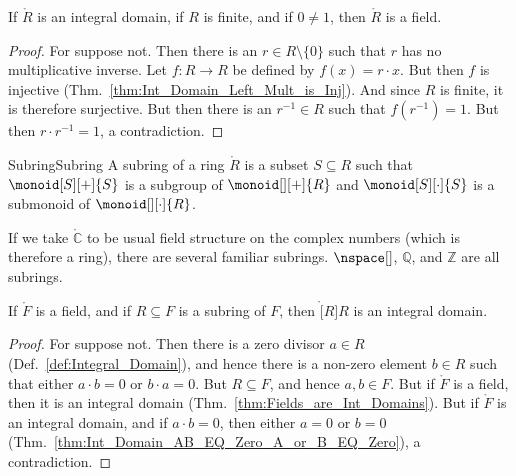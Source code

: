     \begin{theorem}
        \label{thm:Finite_Int_Domain_if_Field}%
        If $\ring{R}$ is an integral domain, if $R$ is finite, and if
        $0\ne{1}$, then $\ring{R}$ is a field.
    \end{theorem}
    \begin{proof}
        For suppose not. Then there is an $r\in{R}\setminus\{0\}$ such that
        $r$ has no multiplicative inverse. Let $f:R\rightarrow{R}$ be
        defined by $f(x)=r\cdot{x}$. But then $f$ is injective
        (Thm.~\ref{thm:Int_Domain_Left_Mult_is_Inj}). And since $R$ is
        finite, it is therefore surjective. But then there is an
        $r^{\minus{1}}\in{R}$ such that $f(r^{\minus{1}})=1$. But then
        $r\cdot{r}^{\minus{1}}=1$, a contradiction.
    \end{proof}
    \begin{fdefinition}{Subring}{Subring}
        A subring of a ring $\ring{R}$ is a subset $S\subseteq{R}$ such that
        $\monoid[S][+]{S}$ is a subgroup of $\monoid[][+]{R}$ and
        $\monoid[S][\cdot]{S}$ is a submonoid of $\monoid[][\cdot]{R}$.
    \end{fdefinition}
    \begin{example}
        If we take $\ring{\mathbb{C}}$ to be usual field structure on the
        complex numbers (which is therefore a ring), there are several
        familiar subrings. $\nspace[]$, $\mathbb{Q}$, and $\mathbb{Z}$ are
        all subrings.
    \end{example}
    \begin{theorem}
        \label{thm:Subring_of_Field_is_Int_Domain}%
        If $\ring{F}$ is a field, and if $R\subseteq{F}$ is a subring of
        $F$, then $\ring[R]{R}$ is an integral domain.
    \end{theorem}
    \begin{proof}
        For suppose not. Then there is a zero divisor $a\in{R}$
        (Def.~\ref{def:Integral_Domain}), and hence there is a non-zero
        element $b\in{R}$ such that either $a\cdot{b}=0$ or $b\cdot{a}=0$.
        But $R\subseteq{F}$, and hence $a,b\in{F}$. But if $\ring{F}$ is a
        field, then it is an integral domain
        (Thm.~\ref{thm:Fields_are_Int_Domains}). But if $\ring{F}$ is an
        integral domain, and if $a\cdot{b}=0$, then either $a=0$ or $b=0$
        (Thm.~\ref{thm:Int_Domain_AB_EQ_Zero_A_or_B_EQ_Zero}),
        a contradiction.
    \end{proof}
